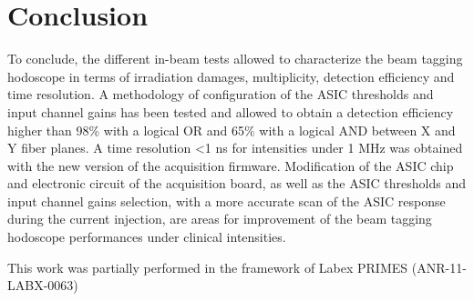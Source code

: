 \documentclass[a4paper,11pt]{article}
\begin{document}
\section{Conclusion}
To conclude, the different in-beam tests allowed to characterize the beam tagging hodoscope in terms of irradiation damages, multiplicity, detection efficiency and time resolution. A methodology of configuration of the ASIC thresholds and input channel gains has been tested and allowed to obtain a detection efficiency higher than 98\% with a logical OR and 65\% with a logical AND between X and Y fiber planes. A time resolution <1 ns for intensities under 1 MHz was obtained with the new version of the acquisition firmware.
Modification of the ASIC chip and electronic circuit of the acquisition board, as well as the ASIC thresholds and input channel gains selection, with a more accurate scan of the ASIC response during the current injection, are areas for improvement of the beam tagging hodoscope performances under clinical intensities.






\acknowledgments
This work was partially performed in the framework of Labex PRIMES (ANR-11-LABX-0063) 
















\end{document}
